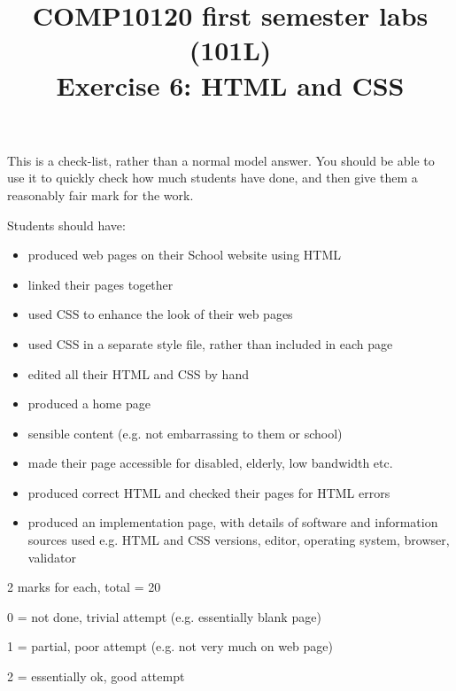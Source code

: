 \documentclass[12pt]{article}
\title{COMP10120 first semester labs (101L) \\
       Exercise 6: HTML and CSS}
\author{}
\date{}
\begin{document}
\maketitle

This is a check-list, rather than a normal model answer. You should
be able to use it to quickly check how much students have done, and
then give them a reasonably fair mark for the work.

Students should have:

\begin{itemize}
\item produced web pages on their School website using HTML

\item linked their pages together

\item used CSS to enhance the look of their web pages

\item used CSS in a separate style file, rather than included in each page

\item edited all their HTML and CSS by hand

\item produced a home page

\item sensible content (e.g. not embarrassing to them or school)

\item made their page accessible for disabled, elderly, low bandwidth etc.

\item produced correct HTML and checked their pages for HTML errors

\item produced an implementation page, with details of software and
  information sources used e.g. HTML and CSS versions, editor,
  operating system, browser, validator
\end{itemize}


2 marks for each, total = 20

 0 = not done, trivial attempt (e.g. essentially blank page)

 1 = partial, poor attempt (e.g. not very much on web page)

 2 = essentially ok, good attempt
\end{document}
